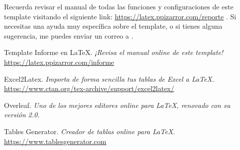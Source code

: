 		Recuerda revisar el manual de todas las funciones y configuraciones de este template visitando el siguiente link: \url{https://latex.ppizarror.com/reporte} \cite{templateinforme}. Si necesitas una ayuda muy específica sobre el template, o si tienes alguna sugerencia, me puedes enviar un correo a .


\newpage %
\begin{references}
	Template Informe en \LaTeX.
	\textit{¡Revisa el manual online de este template!} \\
	\url{https://latex.ppizarror.com/informe}

	Excel2Latex.
	\textit{Importa de forma sencilla tus tablas de Excel a \LaTeX.} \\
	\url{https://www.ctan.org/tex-archive/support/excel2latex/}

	Overleaf.
	\textit{Uno de los mejores editores online para \LaTeX, renovado con su versión 2.0.} \\
	\href{https://es.overleaf.com}{}
	
	Tables Generator.
	\textit{Creador de tablas online para \LaTeX.}\\
	\url{https://www.tablesgenerator.com}
\end{references}


